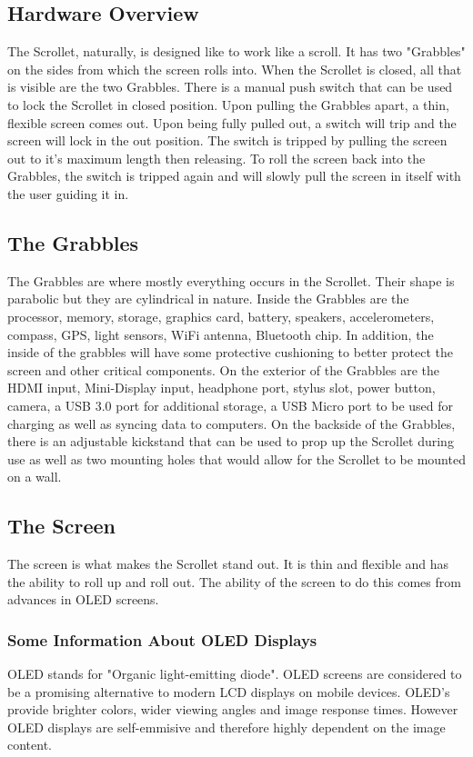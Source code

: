 \documentclass[a4paper]{article}
\begin{document}
\subsection{Hardware Overview}
The Scrollet, naturally, is designed like to work like a scroll. It has two "Grabbles" on the sides from which the screen rolls into. When the Scrollet is closed, all that is visible are the two Grabbles. There is a manual push switch that can be used to lock the Scrollet in closed position. Upon pulling the Grabbles apart, a thin, flexible screen comes out. Upon being fully pulled out, a switch will trip and the screen will lock in the out position. The switch is tripped by pulling the screen out to it's maximum length then releasing. To roll the screen back into the Grabbles, the switch is tripped again and will slowly pull the screen in itself with the user guiding it in.

\subsection{The Grabbles}
The Grabbles are where mostly everything occurs in the Scrollet. Their shape is parabolic but they are cylindrical in nature. Inside the Grabbles are the processor, memory, storage, graphics card, battery, speakers, accelerometers, compass, GPS, light sensors, WiFi antenna, Bluetooth chip. In addition, the inside of the grabbles will have some protective cushioning to better protect the screen and other critical components. On the exterior of the Grabbles are the HDMI input, Mini-Display input, headphone port, stylus slot, power button, camera, a USB 3.0 port for additional storage, a USB Micro port to be used for charging as well as syncing data to computers. On the backside of the Grabbles, there is an adjustable kickstand that can be used to prop up the Scrollet during use as well as two mounting holes that would allow for the Scrollet to be mounted on a wall.

\subsection{The Screen}
The screen is what makes the Scrollet stand out. It is thin and flexible and has the ability to roll up and roll out. The ability of the screen to do this comes from advances in OLED screens. 

\subsubsection{Some Information About OLED Displays}
OLED stands for "Organic light-emitting diode". \cite{Lin} OLED screens are considered to be a promising alternative to modern LCD displays on mobile devices. \cite{Lin} OLED's provide brighter colors, wider viewing angles and image response times. However OLED displays are self-emmisive and therefore highly dependent on the image content. \cite{Lin}
\end{document}
